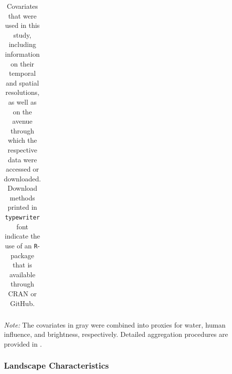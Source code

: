 \documentclass[../FinalThesis.tex]{subfiles}
\begin{document}
\onehalfspacing
\begin{table}[htbp]
 \begin{center}
    \caption{Covariates that were used in this study, including information on
    their temporal and spatial resolutions, as well as on the avenue through
    which the respective data were accessed or downloaded. Download methods
    printed in \texttt{typewriter} font indicate the use of an
    \texttt{R}-package that is available through CRAN or GitHub.}
    \label{CovariatesCH3}
   \begin{threeparttable}
    \begin{tabular}{lcr}
      
    \end{tabular}
    \begin{tablenotes}
      \item \textit{Note:} The covariates in gray were combined into proxies for
      water, human influence, and brightness, respectively. Detailed
      aggregation procedures are provided in \citet{Hofmann.2021}.
    \end{tablenotes}
   \end{threeparttable}
 \end{center}
\end{table}
\doublespacing

\subsubsection{Landscape Characteristics}
\end{document}
